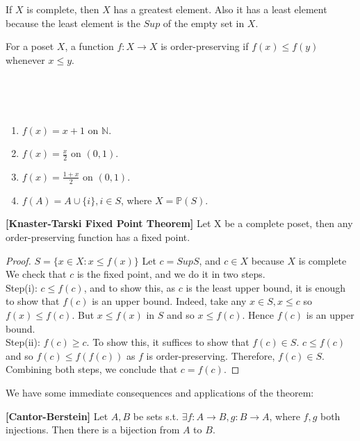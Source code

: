 \begin{remark} If $X$ is complete, then $X$ has a greatest element.
Also it has a least element because the least element is the $Sup$
of the empty set in $X$.
\end{remark}
\begin{definition} For a poset $X$, a function $f: X \rightarrow X$
is order-preserving if $f(x) \le f(y)$ whenever $x \le y$.
\end{definition}
~\\
\begin{example}
~\\
\begin{enumerate}
\item $f(x)=x+1$ on $\mathbb{N}$.\\
\item $f(x)=\frac{x}{2}$ on $(0,1)$.\\
\item $f(x)=\frac{1+x}{2}$ on $(0,1)$.\\
\item $f(A)=A \cup \{i\}, i \in S$, where $X=\mathbb{P}(S)$.
\end{enumerate}
\end{example}
\begin{theorem}{\bf [Knaster-Tarski Fixed Point Theorem]}\label{F;Fixed}
Let X be a complete poset, then any order-preserving function has a fixed point.
\end{theorem}
\begin{proof} $S = \{x \in X: x \le f(x)\}$ Let $c = Sup S$, and $c \in X$
because $X$ is complete
We check that $c$ is the fixed point, and we do it in two steps.\\
Step(i): $c \le f(c)$, and to show this, as $c$ is the least upper bound,
it is enough to show that $f(c)$ is an upper bound. Indeed, take any $x \in S, x \le c$
so $f(x) \le f(c)$. But $x \le f(x)$ in $S$ and so $x \le f(c)$.
Hence $f(c)$ is an upper bound.\\
Step(ii): $f(c) \ge c$. To show this, it suffices to show that $f(c)
\in S$. $c \le f(c)$ and so $f(c) \le f(f(c))$ as $f$ is order-preserving.
Therefore, $f(c) \in S$.\\
Combining both steps, we conclude that $c=f(c)$.
\end{proof}
We have some immediate consequences and applications of the theorem:
\begin{corollary}{\bf [Cantor-Berstein]}\label{C;Cantor}
Let $A,B$ be sets s.t. $\exists f: A \rightarrow B, g: B \rightarrow A$,
where $f,g$ both injections.
Then there is a bijection from $A$ to $B$.
\end{corollary}

